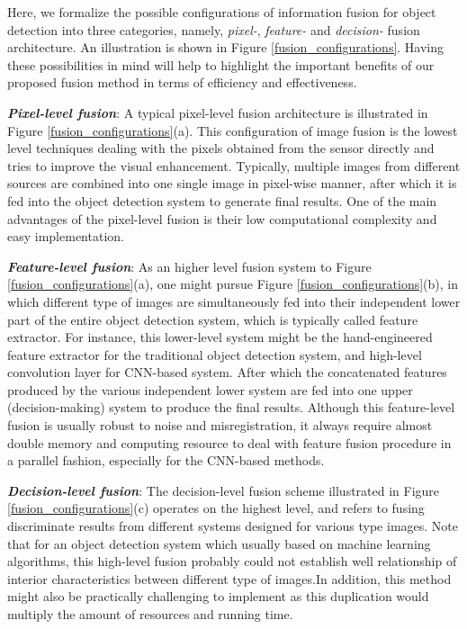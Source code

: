 \documentclass[journal]{IEEEtran}
\begin{document}
Here, we formalize the possible configurations of information fusion for object detection into three categories, namely, \textit{pixel-}, \textit{feature-} and \textit{decision-} fusion architecture. An illustration is shown in Figure \ref{fusion_configurations}. Having these possibilities in mind will help to highlight the important benefits of our proposed fusion method in terms of efficiency and effectiveness.

\textbf{\textit{Pixel-level fusion}}: A typical pixel-level fusion architecture is illustrated in Figure \ref{fusion_configurations}(a). This configuration of image fusion is the lowest level techniques dealing with the pixels obtained from the sensor directly and tries to improve the visual enhancement. Typically, multiple images from different sources are combined into one single image in pixel-wise manner, after which it is fed into the object detection system to generate final results. One of the main advantages of the pixel-level fusion is their low computational complexity and easy implementation.

\textbf{\textit{Feature-level fusion}}: As an higher level fusion system to Figure \ref{fusion_configurations}(a), one might pursue Figure \ref{fusion_configurations}(b), in which different type of images are simultaneously fed into their independent lower part of the entire object detection system, which is typically called feature extractor. For instance, this lower-level system might be the hand-engineered feature extractor for the traditional object detection system, and high-level convolution layer for CNN-based system. After which the concatenated features produced by the various independent lower system are fed into one upper (decision-making) system to produce the final results. Although this feature-level fusion is usually robust to noise and misregistration, it always require almost double memory and computing resource to deal with feature fusion procedure in a parallel fashion, especially for the CNN-based methods. 

\textbf{\textit{Decision-level fusion}}: The decision-level fusion scheme illustrated in Figure \ref{fusion_configurations}(c) operates on the highest level, and refers to fusing discriminate results from different systems designed for various type images. Note that for an object detection system which usually based on machine learning algorithms, this high-level fusion probably could not establish well relationship of interior characteristics between different type of images.In addition, this method might also be practically challenging to implement as this duplication would multiply the amount of resources and running time.
\end{document}
